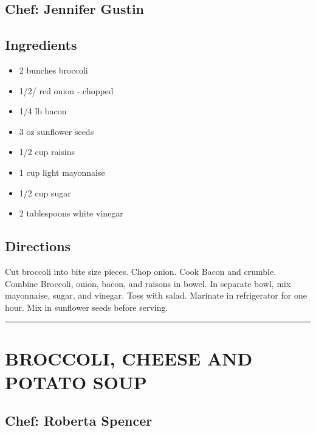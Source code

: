 \documentclass[
]{book}
\providecommand{\tightlist}{%
  \setlength{\itemsep}{0pt}\setlength{\parskip}{0pt}}
\begin{document}
\hypertarget{chef-jennifer-gustin-3}{%
\subsection*{Chef: Jennifer Gustin}\label{chef-jennifer-gustin-3}}


\hypertarget{ingredients-14}{%
\subsection*{Ingredients}\label{ingredients-14}}


\begin{itemize}
\tightlist
\item
  2 bunches broccoli
\item
  1/2/ red onion - chopped
\item
  1/4 lb bacon
\item
  3 oz sunflower seeds
\item
  1/2 cup raisins
\item
  1 cup light mayonnaise
\item
  1/2 cup sugar
\item
  2 tablespoons white vinegar
\end{itemize}

\hypertarget{directions-14}{%
\subsection*{Directions}\label{directions-14}}


Cut broccoli into bite size pieces. Chop onion. Cook Bacon and crumble. Combine Broccoli, onion, bacon, and raisons in bowel. In separate bowl, mix mayonnaise, sugar, and vinegar. Toss with salad. Marinate in refrigerator for one hour. Mix in sunflower seeds before serving.

\begin{center}\rule{0.5\linewidth}{0.5pt}\end{center}

\hypertarget{broccoli-cheese-and-potato-soup}{%
\section*{BROCCOLI, CHEESE AND POTATO SOUP}\label{broccoli-cheese-and-potato-soup}}


\hypertarget{chef-roberta-spencer-1}{%
\subsection*{Chef: Roberta Spencer}\label{chef-roberta-spencer-1}}
\end{document}
